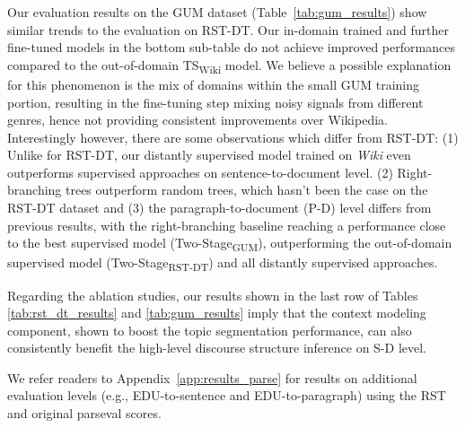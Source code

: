 \documentclass[letterpaper]{article} %
\begin{document}
Our evaluation results on the GUM dataset (Table~\ref{tab:gum_results}) show similar trends to the evaluation on RST-DT. 
Our in-domain trained and further fine-tuned models in the bottom sub-table do not achieve improved performances compared to the out-of-domain TS\textsubscript{Wiki} model. We believe a possible explanation for this phenomenon is the mix of domains within the small GUM training portion, resulting in the fine-tuning step mixing noisy signals from different genres, hence not providing consistent improvements over Wikipedia. Interestingly however, there are some observations which  differ from RST-DT:
(1) Unlike for RST-DT, our distantly supervised model trained on \textit{Wiki} even outperforms supervised approaches on sentence-to-document level. (2) Right-branching trees outperform random trees, which hasn't been the case on the RST-DT dataset and (3) the paragraph-to-document (P-D) level differs from previous results, with the right-branching baseline reaching a performance close to the best supervised model (Two-Stage\textsubscript{GUM}), outperforming the out-of-domain supervised model (Two-Stage\textsubscript{RST-DT}) and all distantly supervised approaches.

Regarding the ablation studies, our results shown in the last row of Tables \ref{tab:rst_dt_results} and \ref{tab:gum_results} imply that the context modeling component, shown to boost the topic segmentation performance, can also consistently benefit the high-level discourse structure inference on S-D level. 

We refer readers to Appendix~\ref{app:results_parse} for results on additional evaluation levels (e.g., EDU-to-sentence and EDU-to-paragraph) using the RST and original parseval scores.
\end{document}

